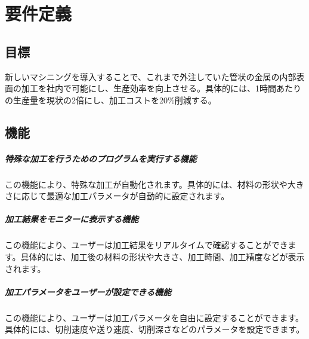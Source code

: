 \chapter{要件定義}



\section{目標}
新しいマシニングを導入することで、これまで外注していた管状の金属の内部表面の加工を社内で可能にし、生産効率を向上させる。具体的には、1時間あたりの生産量を現状の2倍にし、加工コストを20\%削減する。



\section{機能}
\paragraph{特殊な加工を行うためのプログラムを実行する機能}
この機能により、特殊な加工が自動化されます。具体的には、材料の形状や大きさに応じて最適な加工パラメータが自動的に設定されます。

\paragraph{加工結果をモニターに表示する機能}
この機能により、ユーザーは加工結果をリアルタイムで確認することができます。具体的には、加工後の材料の形状や大きさ、加工時間、加工精度などが表示されます。

\paragraph{加工パラメータをユーザーが設定できる機能}
この機能により、ユーザーは加工パラメータを自由に設定することができます。具体的には、切削速度や送り速度、切削深さなどのパラメータを設定できます。

